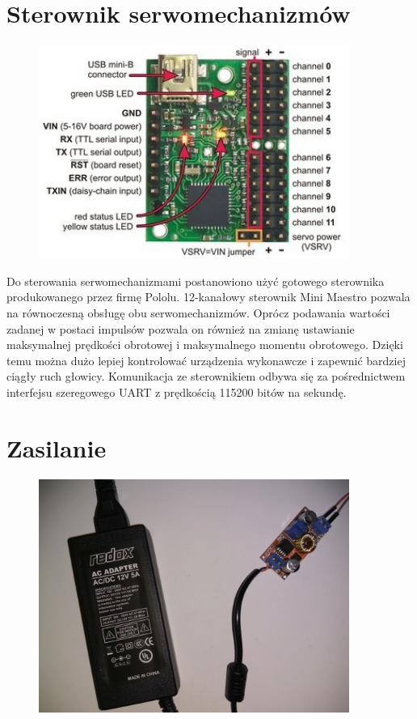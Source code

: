 \section{Sterownik serwomechanizmów}
\label{sec:sterownik}

\begin{figure}[H]
	\centering
	\includegraphics[width=4in]{maestro.jpg}
\end{figure}

Do sterowania serwomechanizmami postanowiono użyć gotowego sterownika produkowanego przez firmę Pololu. 12-kanałowy sterownik Mini Maestro pozwala na równoczesną obsługę obu serwomechanizmów. Oprócz podawania wartości zadanej w postaci impulsów pozwala on również na zmianę ustawianie maksymalnej prędkości obrotowej i maksymalnego momentu obrotowego. Dzięki temu można dużo lepiej kontrolować urządzenia wykonawcze i zapewnić bardziej ciągły ruch głowicy. Komunikacja ze sterownikiem odbywa się za pośrednictwem interfejsu szeregowego UART z prędkością 115200 bitów na sekundę.

\section{Zasilanie}
\label{sec:zasilanie}

\begin{figure}[H]
	\centering
	\includegraphics[width=4in]{zasilanie.jpg}
\end{figure}

